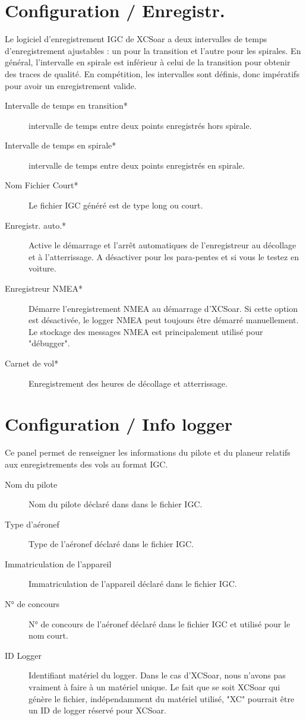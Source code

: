 \section{Configuration / Enregistr.} \label{conf:logger}

Le logiciel d'enregistrement IGC de XCSoar a deux intervalles de temps d'enregistrement ajustables : un pour la transition et l'autre pour les spirales. En général, l'intervalle en spirale est inférieur à celui de la transition pour obtenir des traces de qualité. En compétition, les intervalles sont définis, donc impératifs pour avoir un enregistrement valide.

\begin{description}
\item[Intervalle de temps en transition*]  intervalle de temps entre deux points enregistrés hors spirale.
\item[Intervalle de temps en spirale*]  intervalle de temps entre deux points enregistrés en spirale.
\item[Nom Fichier Court*]  Le fichier IGC généré est de type long ou court.
\item[Enregistr. auto.*]  Active le démarrage et l'arrêt automatiques de l'enregistreur au décollage et à l'atterrissage. A désactiver pour les para-pentes et si vous le testez en voiture.
\item[Enregistreur NMEA*]  Démarre l'enregistrement NMEA au démarrage d'XCSoar. Si cette option est désactivée, le logger NMEA peut toujours être démarré manuellement. Le stockage des messages NMEA est principalement utilisé pour "débugger". 
\item[Carnet de vol*]  Enregistrement des heures de décollage et atterrissage.
\end{description}

\section{Configuration / Info logger} \label{conf:loggerInfo}
Ce panel permet de renseigner les informations du pilote et du planeur relatifs aux enregistrements des vols au format IGC. 

\begin{description}
\item[Nom du pilote]  Nom du pilote déclaré dans dans le fichier IGC.
\item[Type d'aéronef]  Type de l'aéronef déclaré dans le fichier IGC.
\item[Immatriculation de l'appareil]  Immatriculation de l'appareil déclaré dans le fichier IGC.
\item[N° de concours]  N° de concours  de l'aéronef déclaré dans le fichier IGC et utilisé pour le nom court.
\item[ID Logger]  Identifiant matériel du logger. Dans le cas d'XCSoar, nous n'avons pas vraiment à faire à un matériel unique. Le fait que se soit XCSoar qui génère le fichier, indépendamment du matériel utilisé, "XC" pourrait être un ID de logger réservé pour XCSoar.
\end{description}

